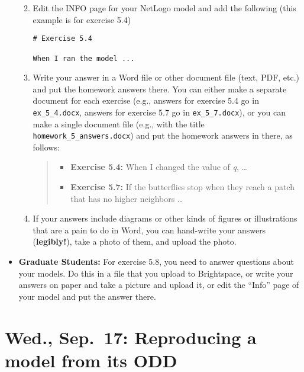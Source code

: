 \documentclass[
]{article}
\providecommand{\tightlist}{%
  \setlength{\itemsep}{0pt}\setlength{\parskip}{0pt}}
\begin{document}
\begin{itemize}
  \begin{enumerate}
  \def\labelenumi{\arabic{enumi}.}
  \item
    Edit the INFO page for your NetLogo model and add the following
    (this example is for exercise 5.4)

\begin{verbatim}
# Exercise 5.4

When I ran the model ...
\end{verbatim}
  \item
    Write your answer in a Word file or other document file (text, PDF,
    etc.) and put the homework answers there. You can either make a
    separate document for each exercise (e.g., answers for exercise 5.4
    go in \texttt{ex\_5\_4.docx}, answers for exercise 5.7 go in
    \texttt{ex\_5\_7.docx}), or you can make a single document file
    (e.g., with the title \texttt{homework\_5\_answers.docx}) and put
    the homework answers in there, as follows:

    \begin{quote}
    \begin{itemize}
    \tightlist
    \item
      \textbf{Exercise 5.4:} When I changed the value of \emph{q},
      \ldots{}
    \item
      \textbf{Exercise 5.7:} If the butterflies stop when they reach a
      patch that has no higher neighbors \ldots{}
    \end{itemize}
    \end{quote}
  \item
    If your answers include diagrams or other kinds of figures or
    illustrations that are a pain to do in Word, you can hand-write your
    answers (\textbf{legibly!}), take a photo of them, and upload the
    photo.
  \end{enumerate}
\item
  \textbf{Graduate Students:} For exercise 5.8, you need to answer
  questions about your models. Do this in a file that you upload to
  Brightspace, or write your answers on paper and take a picture and
  upload it, or edit the ``Info'' page of your model and put the answer
  there.
\end{itemize}

\section{Wed., Sep.~17: Reproducing a model from its
ODD}\label{wed.-sep.-17-reproducing-a-model-from-its-odd}
\end{document}
